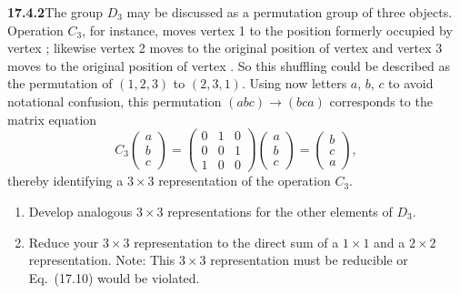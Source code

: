 \par\bigskip
\noindent\textbf{17.4.2}\quad The group $D_{3}$ may be discussed as a
permutation group of three objects. Operation $C_{3}$, for instance,
moves vertex 1 to the position formerly occupied by vertex ;
likewise vertex 2 moves to the original position of vertex  and
vertex 3 moves to the original position of vertex . So this
shuffling could be described as the permutation of $(1,2,3)$ to
$(2,3,1)$. Using now letters $a$, $b$, $c$ to avoid notational
confusion, this permutation $(abc)\to(bca)$ corresponds to the matrix
equation
\[
C_{3}\begin{pmatrix}a\\b\\c\end{pmatrix}
=\begin{pmatrix}0&1&0\\0&0&1\\1&0&0\end{pmatrix}
\begin{pmatrix}a\\b\\c\end{pmatrix}
=\begin{pmatrix}b\\c\\a\end{pmatrix},
\]
thereby identifying a $3\times3$ representation of the operation
$C_{3}$.
\begin{enumerate}
\item[(a)] Develop analogous $3\times3$ representations for the other
elements of $D_{3}$.
\item[(b)] Reduce your $3\times3$ representation to the direct sum of
a $1\times1$ and a $2\times2$ representation. Note: This $3\times3$
representation must be reducible or Eq.~(17.10) would be violated.
\end{enumerate}
\par{}
\solution
{}
